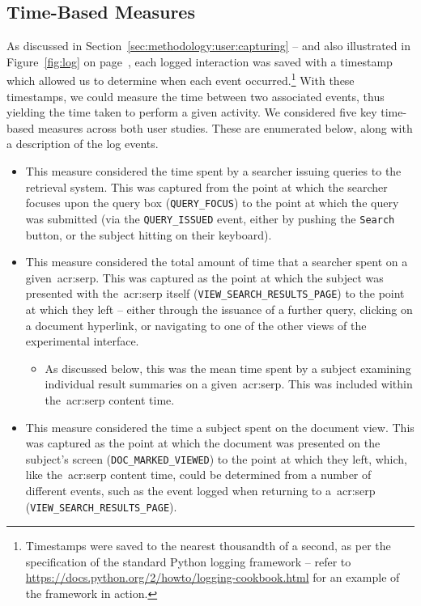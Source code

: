 \subsection{Time-Based Measures}\label{sec:methodology:extracting:time}
As discussed in Section~\ref{sec:methodology:user:capturing} -- and also illustrated in Figure~\ref{fig:log} on page~\pageref{fig:log}, each logged interaction was saved with a timestamp which allowed us to determine when each event occurred.\footnote{Timestamps were saved to the nearest thousandth of a second, as per the specification of the standard Python logging framework -- refer to \url{https://docs.python.org/2/howto/logging-cookbook.html}  for an example of the framework in action.} With these timestamps, we could measure the time between two associated events, thus yielding the time taken to perform a given activity. We considered five key time-based measures across both user studies. These are enumerated below, along with a description of the log events.

\begin{itemize}
    \item{ This measure considered the time spent by a searcher issuing queries to the retrieval system. This was captured from the point at which the searcher focuses upon the query box (\texttt{QUERY\_FOCUS}) to the point at which the query was submitted (via the \texttt{QUERY\_ISSUED} event, either by pushing the \texttt{Search} button, or the subject hitting \Return on their keyboard).}
    \item{ This measure considered the total amount of time that a searcher spent on a given~\gls{acr:serp}. This was captured as the point at which the subject was presented with the~\gls{acr:serp} itself (\texttt{VIEW\_SEARCH\_RESULTS\_PAGE}) to the point at which they left -- either through the issuance of a further query, clicking on a document hyperlink, or navigating to one of the other views of the experimental interface.}
    
    \begin{itemize}
        \item{ As discussed below, this was the mean time spent by a subject examining individual result summaries on a given~\gls{acr:serp}. This was included within the~\gls{acr:serp} content time.}
    \end{itemize}
    
    \item{ This measure considered the time a subject spent on the document view. This was captured as the point at which the document was presented on the subject's screen (\texttt{DOC\_MARKED\_VIEWED}) to the point at which they left, which, like the~\gls{acr:serp} content time, could be determined from a number of different events, such as the event logged when returning to a~\gls{acr:serp} (\texttt{VIEW\_SEARCH\_RESULTS\_PAGE}).}
\end{itemize}

